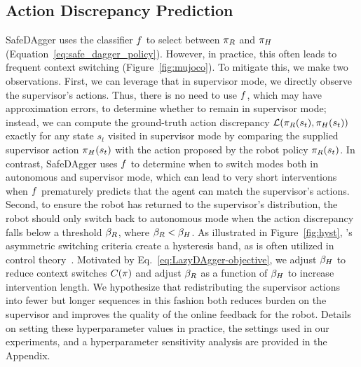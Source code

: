 \subsection{Action Discrepancy Prediction}
\label{subsec:ac-disc}
SafeDAgger uses the classifier $f$ to select between $\pi_{R}$ and $\pi_{H}$ (Equation~\eqref{eq:safe_dagger_policy}). However, in practice, this often leads to frequent context switching (Figure~\ref{fig:mujoco}). %
To mitigate this, we make two observations. First, we can leverage that in supervisor mode, we directly observe the supervisor's actions. Thus, there is no need to use $f$, which may have approximation errors, to determine whether to remain in supervisor mode; instead, we can compute the ground-truth action discrepancy $\mathcal{L}(\pi_{R}(s_t),\pi_{H}(s_t))$ exactly for any state $s_t$ visited in supervisor mode by comparing the supplied supervisor action $\pi_{H}(s_t)$ with the action proposed by the robot policy $\pi_{R}(s_t)$. In contrast, SafeDAgger uses $f$ to determine when to switch modes both in autonomous and supervisor mode, which can lead to very short interventions when $f$ prematurely predicts that the agent can match the supervisor's actions. Second, to ensure the robot has returned to the supervisor's distribution, the robot should only switch back to autonomous mode when the action discrepancy falls below a threshold $\beta_{R}$, where $\beta_{R} < \beta_{H}$. %
As illustrated in Figure~\ref{fig:hyst}, \algname's asymmetric switching criteria create a hysteresis band, as is often utilized in control theory~\cite{hysteresis}. Motivated by Eq.~\eqref{eq:LazyDAgger-objective}, we adjust $\beta_{H}$ to reduce context switches $C(\pi)$ and adjust $\beta_{R}$ as a function of $\beta_{H}$ to increase intervention length. We hypothesize that redistributing the supervisor actions into fewer but longer sequences in this fashion both reduces burden on the supervisor and improves the quality of the online feedback for the robot. Details on setting these hyperparameter values in practice, the settings used in our experiments, and a hyperparameter sensitivity analysis are provided in the Appendix.%

